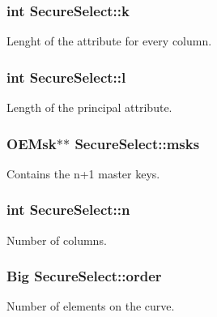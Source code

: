 \subsubsection[{\texorpdfstring{k}{k}}]{\setlength{\rightskip}{0pt plus 5cm}int Secure\+Select\+::k}\hypertarget{classSecureSelect_aa9172d68f4a5f9aef784703878e2c352}{}\label{classSecureSelect_aa9172d68f4a5f9aef784703878e2c352}
Lenght of the attribute for every column. 
\subsubsection[{\texorpdfstring{l}{l}}]{\setlength{\rightskip}{0pt plus 5cm}int Secure\+Select\+::l}\hypertarget{classSecureSelect_a010ed62263ff19f8b07dfaa298962f24}{}\label{classSecureSelect_a010ed62263ff19f8b07dfaa298962f24}
Length of the principal attribute. 
\subsubsection[{\texorpdfstring{msks}{msks}}]{\setlength{\rightskip}{0pt plus 5cm}O\+E\+Msk$\ast$$\ast$ Secure\+Select\+::msks}\hypertarget{classSecureSelect_a8f1233a931a2dce84a7f9588721d8301}{}\label{classSecureSelect_a8f1233a931a2dce84a7f9588721d8301}
Contains the n+1 master keys. 
\subsubsection[{\texorpdfstring{n}{n}}]{\setlength{\rightskip}{0pt plus 5cm}int Secure\+Select\+::n}\hypertarget{classSecureSelect_a0834ef0de36dad948cec8d54fc89aada}{}\label{classSecureSelect_a0834ef0de36dad948cec8d54fc89aada}
Number of columns. 
\subsubsection[{\texorpdfstring{order}{order}}]{\setlength{\rightskip}{0pt plus 5cm}Big Secure\+Select\+::order}\hypertarget{classSecureSelect_ac97b5a9177b47f64f49891feb67b69b2}{}\label{classSecureSelect_ac97b5a9177b47f64f49891feb67b69b2}
Number of elements on the curve. 
